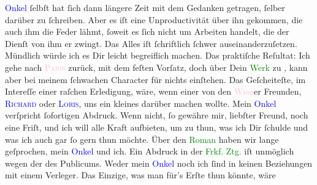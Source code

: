                   \textcolor{blue}{Onkel}{} ſelbſt hat ſich dann
               längere Zeit mit dem Gedanken getragen, ſelber darüber zu ſchreiben. Aber es iſt eine
               Unproductivität über ihn gekommen, die auch ihm die Feder lähmt, ſoweit es ſich nicht
               um Arbeiten handelt, die der Dienſt von ihm er zwingt. Das Alles iſt {\pb} ſchriftlich ſchwer auseinanderzuſetzen.
               Mündlich würde ich es Dir leicht begreiflich machen. Das praktiſche Reſultat: Ich
               gehe nach \textcolor{pink}{\textsc{Paris}}{}\ledrightnote{\textcolor{pink}{Paris}} zurück, mit dem feſten Vorſatz, doch über Dein \textcolor{green}{Werk}{} zu \label{K_L02709-7v}\label{K_L02709-7h}, kann aber bei meinem ſchwachen Character für nichts einſtehen.
               Das Geſcheiteſte, im Intereſſe einer raſchen Erledigung, wäre, wenn einer von den \textcolor{pink}{Wien}{}\ledrightnote{\textcolor{pink}{Wien}}er Freunden, \textsc{\textcolor{blue}{Richard}{}\ledrightnote{\textcolor{blue}{Richard Beer-Hofmann}}} oder \textsc{\textcolor{blue}{Loris}{}\ledrightnote{\textcolor{blue}{Hugo von Hofmannsthal}}}, uns ein kleines \introOben{}\label{K_L02709-8v}\label{K_L02709-8h}\introOben{}{ }\strikeout{\textcolor{gray}{×}\-\textcolor{gray}{×}\-\textcolor{gray}{×}\-\textcolor{gray}{×}\-\textcolor{gray}{×}\-\textcolor{gray}{×}} darüber machen wollte. Mein \textcolor{blue}{Onkel}{} verſpricht {\pb}ſofortigen Abdruck. Wenn
               nicht, ſo gewähre mir, liebſter Freund, noch eine Friſt, und ich will alle Kraft
               aufbieten, um zu thun, was ich Dir ſchulde und was ich auch gar ſo gern thun
               möchte.\pend
           \pstart
           Über den \textcolor{green}{Roman}{} haben wir lange
               geſprochen, mein \textcolor{blue}{Onkel}{} und
               ich. Ein Abdruck in der \textcolor{green}{Frkf. Ztg.}{}\ledrightnote{\textcolor{green}{Frankfurter Zeitung}} iſt unmöglich
               wegen der \label{K_L02709-4v}\label{K_L02709-4h}
               des Publicums. Weder mein \textcolor{blue}{Onkel}{} noch ich ſind in keinen Beziehungen mit einem Verleger. {\pb}Das Einzige, was man für’s Erſte thun könnte, wäre

